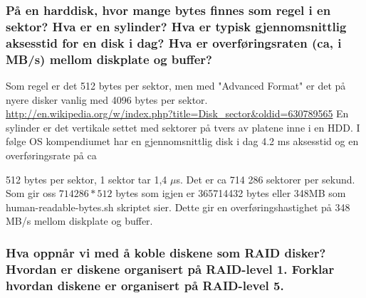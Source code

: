 \documentclass[9pt]{article}
\begin{document}


\subsubsection{På en harddisk, hvor mange bytes finnes som regel i en sektor? Hva er en sylinder? Hva er typisk gjennomsnittlig aksesstid for en disk i dag? Hva er overføringsraten (ca, i MB/s) mellom diskplate og buffer?}

Som regel er det 512 bytes per sektor, men med "Advanced Format" er det på nyere disker vanlig med 4096 bytes per sektor. \url{http://en.wikipedia.org/w/index.php?title=Disk_sector&oldid=630789565}
En sylinder er det vertikale settet med sektorer på tvers av platene inne i en HDD.
I følge OS kompendiumet har en gjennomsnittlig disk i dag 4.2 ms aksesstid og en overføringsrate på ca 

512 bytes per sektor, 1 sektor tar 1,4 $\mu$s. Det er ca 714 286 sektorer per sekund. Som gir oss $714 286 * 512$ bytes som igjen er 365714432 bytes eller 348MB som human-readable-bytes.sh skriptet sier. Dette gir en overføringshastighet på 348 MB/s mellom diskplate og buffer.

\subsubsection{Hva oppnår vi med å koble diskene som RAID disker? Hvordan er diskene organisert på RAID-level 1. Forklar hvordan diskene er organisert på RAID-level 5.}
\end{document}
